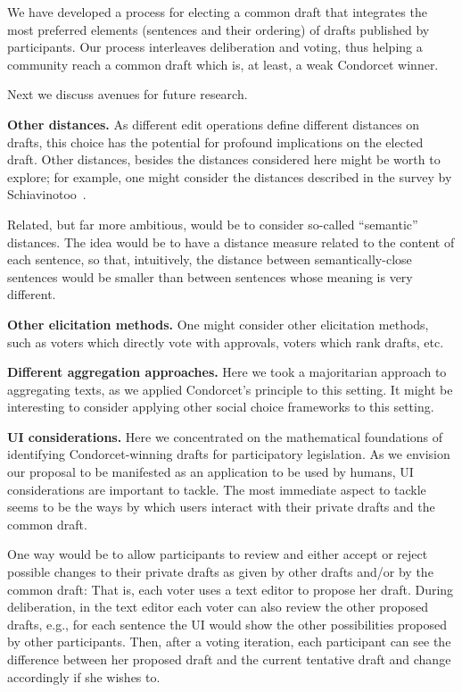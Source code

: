 \documentclass{llncs}
\newcommand{\mypara}[1]{\smallskip\noindent\textbf{#1.}}
\begin{document}
We have developed a process for electing a common draft that integrates the most preferred elements (sentences and their ordering) of drafts published by participants.
%
Our process interleaves deliberation and voting, thus helping a community reach a common draft which is, at least, a weak Condorcet winner.

Next we discuss avenues for future research. 


\mypara{Other distances}
%
As different edit operations define different distances on drafts, this choice has the potential for profound implications on the elected draft. Other distances, besides the distances considered here might be worth to explore; for example, one might consider the distances described in the survey by Schiavinotoo~\cite{schiavinotto2007review}.

Related, but far more ambitious, would be to consider so-called ``semantic'' distances. The idea would be to have a distance measure related to the content of each sentence, so that, intuitively, the distance between semantically-close sentences would be smaller than between sentences whose meaning is very different.


\mypara{Other elicitation methods}
%
One might consider other elicitation methods, such as voters which directly vote with approvals, voters which rank drafts, etc.


\mypara{Different aggregation approaches}
%
Here we took a majoritarian approach to aggregating texts, as we applied Condorcet's principle to this setting. It might be interesting to consider applying other social choice frameworks to this setting.

\mypara{UI considerations}
%
Here we concentrated on the mathematical foundations of identifying Condorcet-winning drafts for participatory legislation. As we envision our proposal to be manifested as an application to be used by humans, UI considerations are important to tackle. The most immediate aspect to tackle seems to be the ways by which users interact with their private drafts and the common draft.

One way would be to allow participants to review and either accept or reject possible changes to their private drafts as given by other drafts and/or by the common draft:
  That is, each voter uses a text editor to propose her draft. During deliberation, in the text editor each voter can also review the other proposed drafts, e.g., for each sentence the UI would show the other possibilities proposed by other participants. Then, after a voting iteration, each participant can see the difference between her proposed draft and the current tentative draft and change accordingly if she wishes to.
\end{document}
